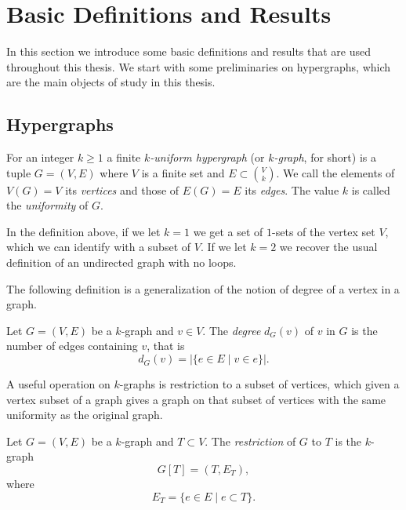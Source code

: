 
\section{Basic Definitions and Results}\label{sec:preliminaries}
In this section we introduce some basic definitions and results that are used throughout this thesis.
We start with some preliminaries on hypergraphs, which are the main objects of study in this thesis.

\subsection{Hypergraphs}\label{subsec:hypergraphs}

\begin{definition}

    For an integer $k \geq 1$ a finite \emph{$k$-uniform hypergraph} (or \emph{$k$-graph}, for short)
    is a tuple $G = (V, E)$ where $V$ is a finite set
    and $E \subset \binom{V}{k}$.
    We call the elements of $V(G) = V$ its \emph{vertices}
    and those of $E(G) = E$ its \emph{edges}.
    The value $k$ is called the \emph{uniformity} of $G$.
\end{definition}

\begin{remark}
    In the definition above, if we let $k=1$ we get a set of $1$-sets of the vertex set $V$,
    which we can identify with a subset of $V$.
    If we let $k=2$ we recover the usual definition of an undirected graph with no loops.
\end{remark}

The following definition is a generalization of the notion of degree
of a vertex in a graph.

\begin{definition}
    Let $G = (V, E)$ be a $k$-graph and $v \in V$.
    The \emph{degree} $d_G(v)$ of $v$ in $G$
    is the number of edges containing $v$, that is
    \[
        d_G(v) = |\{e \in E \mid v \in e\}|.
    \]
\end{definition}

A useful operation on $k$-graphs is restriction to a subset of vertices,
which given a vertex subset of a graph gives a graph on that subset of vertices
with the same uniformity as the original graph.

\begin{definition}

    \label{def:restriction}
    Let $G = (V, E)$ be a $k$-graph and $T \subset V$.
    The \emph{restriction} of $G$ to $T$ is the $k$-graph
    \[
        G[T] = (T, E_T),
    \]
    where
    \[E_T = \{e \in E \mid e \subset T\}.\]
\end{definition}

